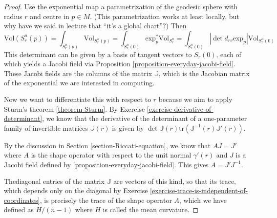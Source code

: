 \begin{proof}
Use the exponential map a parametrization of the geodesic sphere with radius
$r$ and centre in $p\in M$. (This parametrization works at least locally, but why
have we said in lecture that ``it's a global chart''?) Then
$$
\text{Vol}(S^n_r(p))=\int_{S^n_r(p)}\text{Vol}_{S^n_r(p)}=
\int_{S^n_r(0)}\text{exp}_p^*\text{Vol}_{S^n_r}=
\int_{S^n_r(0)}|\det d_{rv} \text{exp}_p|\text{Vol}_{S^n_r(0)}
$$
This determinant can be given by a basis of tangent vectors to $S_r(0)$, each of
which yields a Jacobi field via Proposition 
\ref{proposition-everyday-jacobi-field}. These Jacobi fields are the columns 
of the matrix $\mathbb{J}$, which is the Jacobian matrix of the exponential we 
are interested in computing.

Now we want to differentiate this with respect to $r$ because we aim to apply
Sturm's theorem \ref{theorem-Sturm}. By Exercise
\ref{exercise-derivative-of-determinant}, we know that the derivative of the
determinant of a one-parameter family of invertible matrices $\mathbb{J}(r)$ is
given by $\det \mathbb{J}(r)\text{tr}(\mathbb{J}^{-1}(r)\mathbb{J}'(r))$.

By the discussion in Section \ref{section-Riccati-equation}, we know that
$AJ=J'$ where $A$ is the shape operator with respect to the unit normal
$\gamma'(r)$ and $J$ is a Jacobi field defined by
\ref{proposition-everyday-jacobi-field}.  This gives $A=J'J^{-1}$. 

Thediagonal entries of the matrix $\mathbb{J}$ are vectors of this kind, so that
 its trace, which depends only on the diagonal by Exercise 
\ref{exercise-trace-is-independent-of-coordinates}, is precisely the trace of
the shape operator $A$, which we have defined as $H/(n-1)$ where
$H$ is called the mean curvature.


\end{proof}
